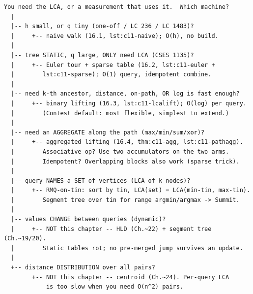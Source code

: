 \begin{lstlisting}[language={}, basicstyle=\ttfamily\small, numbers=none, frame=single]
  You need the LCA, or a measurement that uses it.  Which machine?
  |
  |-- h small, or q tiny (one-off / LC 236 / LC 1483)?
  |     +-- naive walk (16.1, lst:c11-naive); O(h), no build.
  |
  |-- tree STATIC, q large, ONLY need LCA (CSES 1135)?
  |     +-- Euler tour + sparse table (16.2, lst:c11-euler +
  |        lst:c11-sparse); O(1) query, idempotent combine.
  |
  |-- need k-th ancestor, distance, on-path, OR log is fast enough?
  |     +-- binary lifting (16.3, lst:c11-lcalift); O(log) per query.
  |        (Contest default: most flexible, simplest to extend.)
  |
  |-- need an AGGREGATE along the path (max/min/sum/xor)?
  |     +-- aggregated lifting (16.4, thm:c11-agg, lst:c11-pathagg).
  |        Associative op? Use two accumulators on the two arms.
  |        Idempotent? Overlapping blocks also work (sparse trick).
  |
  |-- query NAMES a SET of vertices (LCA of k nodes)?
  |     +-- RMQ-on-tin: sort by tin, LCA(set) = LCA(min-tin, max-tin).
  |        Segment tree over tin for range argmin/argmax -> Summit.
  |
  |-- values CHANGE between queries (dynamic)?
  |     +-- NOT this chapter -- HLD (Ch.~22) + segment tree (Ch.~19/20).
  |        Static tables rot; no pre-merged jump survives an update.
  |
  +-- distance DISTRIBUTION over all pairs?
        +-- NOT this chapter -- centroid (Ch.~24). Per-query LCA
            is too slow when you need O(n^2) pairs.
\end{lstlisting}


